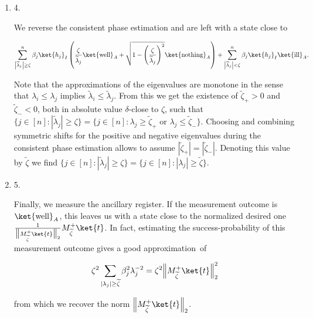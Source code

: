 \documentclass[10pt,a4paper]{article}
\begin{document}
\begin{enumerate}
\item[] 
4. 


We reverse the consistent phase estimation and are left with a state close to\par


\[\begin{gathered}
\sum_{\left|\widetilde{\lambda}_{j}\right|\geq\zeta}^{n}\beta_{j}\ket{h_{j}}_{I}\left(\frac{\zeta}{\widetilde{\lambda}_{j}}\ket{\text{well}}_{A}+\sqrt{1-\left(\frac{\zeta}{\widetilde{\lambda}_{j}}\right)^{2}}\ket{\text{nothing}}_{A}\right)+\sum_{\left|\widetilde{\lambda}_{j}\right|<\zeta}^{n}\beta_{j}\ket{h_{j}}_{I}\ket{\text{ill}}_{A}.
\end{gathered}\]


Note that the approximations of the eigenvalues are monotone in the sense that $\lambda_{i}\leq\lambda_{j}$ implies $\widetilde{\lambda}_{i}\leq\widetilde{\lambda}_{j}$.
From this we get the existence of $\widetilde{\zeta}_{+}>0$ and $\widetilde{\zeta}_{-}<0$, both in absolute value $\delta$-close to $\zeta$, such that
$\{j\in[n]:|\widetilde{\lambda}_{j}|\geq\zeta\}=\{j\in[n]:\lambda_{j}\geq\tilde{\zeta}_{+}\text{ or }\lambda_{j}\leq\tilde{\zeta}_{-}\}$.
Choosing and combining symmetric shifts for the positive and negative eigenvalues during the consistent phase estimation allows to assume $|\widetilde{\zeta}_{+}|=|\widetilde{\zeta}_{-}|$.
Denoting this value by $\tilde{\zeta}$ we find
$\{j\in[n]:|\widetilde{\lambda}_{j}|\geq\zeta\}=\{j\in[n]:|\lambda_{j}|\geq\tilde{\zeta}\}$.\par





\item[] 
5. 


Finally, we measure the ancillary register. If the measurement outcome is $\ket{\text{well}}_{A}$, this leaves us with a state close to the normalized desired one $\frac{1}{\big{\|}M_{\widetilde{\zeta}}^{+}\ket{t}\big{\|}_{2}}M_{\widetilde{\zeta}}^{+}\ket{t}$.
In fact, estimating the success-probability of this measurement outcome gives a good approximation of\par




\[\begin{gathered}
\zeta^{2}\sum_{|\lambda_{j}|\geq\widetilde{\zeta}}\beta_{j}^{2}\lambda_{j}^{-2}=\zeta^{2}\Big{\|}M_{\widetilde{\zeta}}^{+}\ket{t}\Big{\|}_{2}^{2}
\end{gathered}\]


from which we recover the norm $\Big{\|}M_{\widetilde{\zeta}}^{+}\ket{t}\Big{\|}_{2}$.\par





\end{enumerate}
\end{document}
